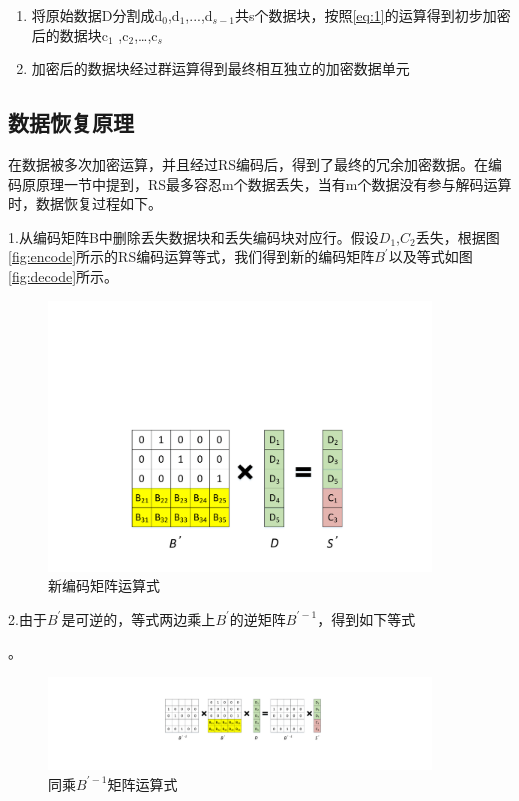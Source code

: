 \begin{enumerate}
    \item 将原始数据D分割成d$_{0}$,d$_{1}$,...,d$_{s-1}$共s个数据块，按照\autoref{eq:1}的运算得到初步加密后的数据块c$_{1}$ ,c$_{2}$,…,c$_{s}$
	\item 加密后的数据块经过群运算得到最终相互独立的加密数据单元
\end{enumerate}

\subsection{数据恢复原理}
在数据被多次加密运算，并且经过RS编码后，得到了最终的冗余加密数据。在编码原原理一节中提到，RS最多容忍m个数据丢失，当有m个数据没有参与解码运算时，数据恢复过程如下。


1.从编码矩阵B中删除丢失数据块和丢失编码块对应行。假设$D_1$,$C_2$丢失，根据图\autoref{fig:encode}所示的RS编码运算等式，我们得到新的编码矩阵$B^{'}$以及等式如图\autoref{fig:decode}所示。
\begin{figure}[H]
	\centering
	\includegraphics[width=4in]{Pics/decode.pdf}
	\caption{新编码矩阵运算式}\label{fig:decode}
\end{figure}


2.由于$B^{'}$是可逆的，等式两边乘上$B^{'}$的逆矩阵$B^{'-1}$，得到如下等式\author{fig:decode2}。
\begin{figure}[H]
	\centering
	\includegraphics[width=4in]{Pics/decode2.pdf}
	\caption{同乘$B^{'-1}$矩阵运算式}\label{fig:decode2}
\end{figure}


